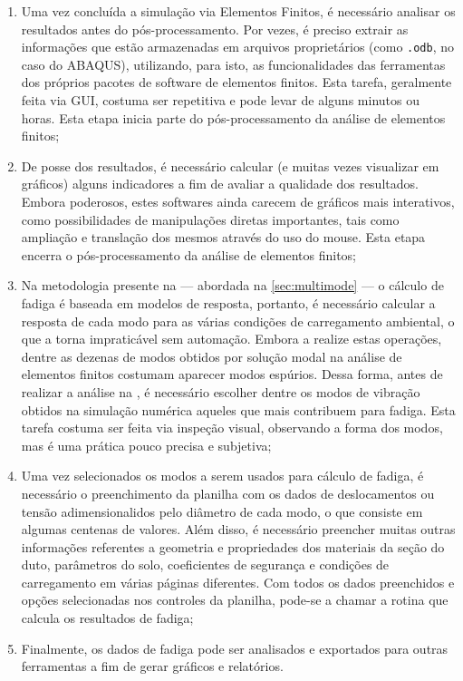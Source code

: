 \begin{enumerate}[label= (\arabic*)]
    \item Uma vez concluída a simulação via Elementos Finitos, é necessário analisar os resultados antes do pós-processamento. Por vezes, é preciso extrair as informações que estão armazenadas em arquivos proprietários (como \texttt{.odb}, no caso do ABAQUS), utilizando, para isto, as funcionalidades das ferramentas dos próprios pacotes de software de elementos finitos. Esta tarefa, geralmente feita via GUI, costuma ser repetitiva e pode levar de alguns minutos ou horas. Esta etapa inicia parte do pós-processamento da análise de elementos finitos;
    \item De posse dos resultados, é necessário calcular (e muitas vezes visualizar em gráficos) alguns indicadores a fim de avaliar a qualidade dos resultados. Embora poderosos, estes softwares ainda carecem de gráficos mais interativos, como possibilidades de manipulações diretas importantes, tais como ampliação e translação dos mesmos através do uso do mouse. Esta etapa encerra o pós-processamento da análise de elementos finitos;
    \item Na metodologia presente na  --- abordada na \autoref{sec:multimode} --- o cálculo de fadiga é baseada em modelos de resposta, portanto, é necessário calcular a resposta de cada modo para as várias condições de carregamento ambiental, o que a torna impraticável sem automação. Embora a  \fatfree realize estas operações, dentre as dezenas de modos obtidos por solução modal na análise de elementos finitos costumam aparecer modos espúrios. Dessa forma, antes de realizar a análise na \fatfree, é necessário escolher dentre os modos de vibração obtidos na simulação numérica aqueles que mais contribuem para fadiga. Esta tarefa costuma ser feita via inspeção visual, observando a forma dos modos, mas é uma prática pouco precisa e subjetiva;
    \item Uma vez selecionados os modos a serem usados para cálculo de fadiga, é necessário o preenchimento da planilha com os dados de deslocamentos ou tensão adimensionalidos pelo diâmetro de cada modo, o que consiste em algumas centenas de valores. Além disso, é necessário preencher muitas outras informações referentes a geometria e propriedades dos materiais da seção do duto, parâmetros do solo, coeficientes de segurança e condições de carregamento em várias páginas diferentes. Com todos os dados preenchidos e opções selecionadas nos controles da planilha, pode-se a chamar a rotina que calcula os resultados de fadiga;
    \item Finalmente, os dados de fadiga pode ser analisados e exportados para outras ferramentas a fim de gerar gráficos e relatórios.
\end{enumerate}

